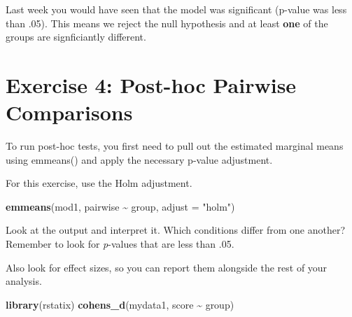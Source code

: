 \documentclass[
]{book}
\newenvironment{Shaded}{\begin{snugshade}}{\end{snugshade}}
\newcommand{\AttributeTok}[1]{\textcolor[rgb]{0.13,0.29,0.53}{#1}}
\newcommand{\ConstantTok}[1]{\textcolor[rgb]{0.56,0.35,0.01}{#1}}
\newcommand{\DecValTok}[1]{\textcolor[rgb]{0.00,0.00,0.81}{#1}}
\newcommand{\FunctionTok}[1]{\textcolor[rgb]{0.13,0.29,0.53}{\textbf{#1}}}
\newcommand{\NormalTok}[1]{#1}
\newcommand{\OtherTok}[1]{\textcolor[rgb]{0.56,0.35,0.01}{#1}}
\newcommand{\SpecialCharTok}[1]{\textcolor[rgb]{0.81,0.36,0.00}{\textbf{#1}}}
\newcommand{\StringTok}[1]{\textcolor[rgb]{0.31,0.60,0.02}{#1}}
\let\oldsection\section
\renewcommand{\section}{\needspace{5\baselineskip}\oldsection}
\begin{document}
\begin{Shaded}
\end{Shaded}

Last week you would have seen that the model was significant (p-value was less than .05). This means we reject the null hypothesis and at least \textbf{one} of the groups are signficiantly different.

\section{Exercise 4: Post-hoc Pairwise Comparisons}\label{exercise-4-post-hoc-pairwise-comparisons}

To run post-hoc tests, you first need to pull out the estimated marginal means using emmeans() and apply the necessary p-value adjustment.

For this exercise, use the Holm adjustment.

\begin{Shaded}
\begin{Highlighting}[]
\FunctionTok{emmeans}\NormalTok{(mod1,}
\NormalTok{        pairwise }\SpecialCharTok{\textasciitilde{}}\NormalTok{ group,}
        \AttributeTok{adjust =} \StringTok{"holm"}\NormalTok{)}
\end{Highlighting}
\end{Shaded}

Look at the output and interpret it. Which conditions differ from one another? Remember to look for \emph{p}-values that are less than .05.

Also look for effect sizes, so you can report them alongside the rest of your analysis.

\begin{Shaded}
\begin{Highlighting}[]
\FunctionTok{library}\NormalTok{(rstatix)}
\FunctionTok{cohens\_d}\NormalTok{(mydata1, score }\SpecialCharTok{\textasciitilde{}}\NormalTok{ group)}
\end{Highlighting}
\end{Shaded}
\end{document}
